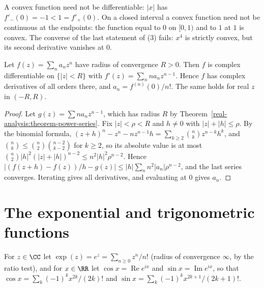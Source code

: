 \begin{counterexample}\label{real-analysis:counterexample-convex}
A convex function need not be differentiable: $|x|$ has $f'_-(0) = -1 < 1 = f'_+(0)$. On a closed interval a convex function need not be continuous at the endpoints: the function equal to $0$ on $[0, 1)$ and to $1$
at $1$ is convex. The converse of the last statement of (3) fails: $x^4$ is strictly convex, but its second derivative vanishes at $0$.
\end{counterexample}

\begin{theorem}\label{real-analysis:theorem-power-series-derivative}
Let $f(z) = \sum_na_nz^n$ have radius of convergence $R > 0$. Then $f$ is complex differentiable on $\{|z| < R\}$ with $f'(z) = \sum_nna_nz^{n-1}$. Hence $f$ has complex derivatives of all
orders there, and $a_n = f^{(n)}(0)/n!$. The same holds for real $z$ in $(-R, R)$.
\end{theorem}

\begin{proof}
Let $g(z) = \sum na_nz^{n-1}$, which has radius $R$ by Theorem~\ref{real-analysis:theorem-power-series}. Fix $|z| < \rho < R$ and $h \neq 0$ with $|z| + |h| \leq \rho$. By the binomial formula,
$(z + h)^n - z^n - nz^{n-1}h = \sum_{k \geq 2}\binom{n}{k}z^{n-k}h^k$, and $\binom{n}{k} \leq \binom{n}{2}\binom{n-2}{k-2}$ for $k \geq 2$, so its absolute value is at most
$\binom{n}{2}|h|^2(|z| + |h|)^{n-2} \leq n^2|h|^2\rho^{n-2}$. Hence
$|(f(z + h) - f(z))/h - g(z)| \leq |h|\sum_n n^2|a_n|\rho^{n-2}$, and the last series converges. Iterating gives all derivatives, and evaluating at $0$ gives $a_n$.
\end{proof}

\section{The exponential and trigonometric functions}\label{real-analysis:section-exponential}

\begin{definition}\label{real-analysis:definition-exponential}
For $z \in \CC$ let $\exp(z) = e^z = \sum_{n \geq 0}z^n/n!$ (radius of convergence $\infty$, by the ratio test), and for $x \in \RR$ let $\cos x = \operatorname{Re} e^{ix}$ and
$\sin x = \operatorname{Im} e^{ix}$, so that $\cos x = \sum_k(-1)^kx^{2k}/(2k)!$ and $\sin x = \sum_k(-1)^kx^{2k+1}/(2k+1)!$.
\end{definition}

